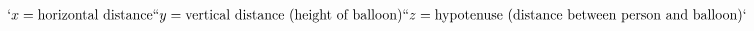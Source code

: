 \documentclass[preview]{standalone}
\begin{document}
\begin{align*}
`x = \text{horizontal distance}`
`y = \text{vertical distance (height of balloon)}`
`z = \text{hypotenuse (distance between person and balloon)}`
\end{align*}
\end{document}
